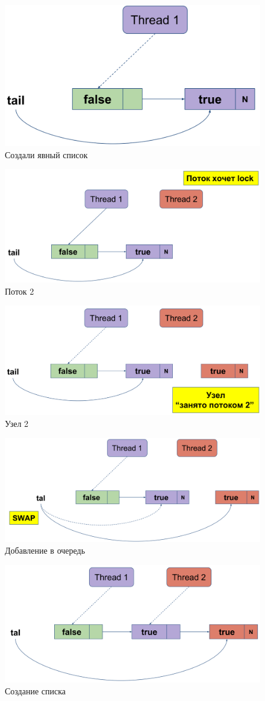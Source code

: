 \documentclass[10pt,a4paper,oneside,titlepage]{article}
\theoremstyle{plain}
\theoremstyle{defenition}
\begin{document}
\begin{figure}[h!]
	\centering
	\includegraphics[width=0.4\linewidth]{pictures/MCS5}
	\caption{Создали явный список}
	\label{fig:mcs5}
\end{figure}

\begin{figure}[h!]
	\centering
	\includegraphics[width=0.4\linewidth]{pictures/MCS6}
	\caption{Поток 2}
	\label{fig:mcs6}
\end{figure}

\begin{figure}[h!]
	\centering
	\includegraphics[width=0.4\linewidth]{pictures/MCS7}
	\caption{Узел 2}
	\label{fig:mcs7}
\end{figure}

\begin{figure}[h!]
	\centering
	\includegraphics[width=0.4\linewidth]{pictures/MCS8}
	\caption{Добавление в очередь}
	\label{fig:mcs8}
\end{figure}

\begin{figure}[h!]
	\centering
	\includegraphics[width=0.4\linewidth]{pictures/MCS9}
	\caption{Создание списка}
	\label{fig:mcs9}
\end{figure}
\end{document}
